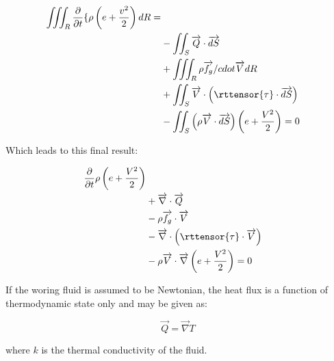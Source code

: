 \begin{equation}
  \begin{split}
  \iiint_R\frac{\partial}{\partial{t}}\{\rho\left(e + \frac{v^2}{2}\right)dR = \\
    & - \iint_S\overrightarrow{Q}\cdot\overrightarrow{dS} \\
    & + \iiint_R\rho\overrightarrow{f_g}/cdot\overrightarrow{V} dR \\ 
    & + \iint_S\overrightarrow{V}\cdot\left(\rttensor{\tau}\cdot\overrightarrow{dS}\right) \\ 
    & - \iint_S\left(\rho\overrightarrow{V} \cdot\overrightarrow{dS}\right)\left(e + \frac{V^2}{2}\right) = 0
  \end{split}
\end{equation}

Which leads to this final result:

\begin{equation}
  \begin{split}
\frac{\partial}{\partial{t}}\rho\left
(e + \frac{V^2}{2}\right) \\
    & + \overrightarrow{\nabla}\cdot\overrightarrow{Q} \\
    & -\rho\overrightarrow{f_g}\cdot\overrightarrow{V} \\
    & - \overrightarrow{\nabla}\cdot\left(\rttensor{\tau}\cdot\overrightarrow{V}\right) \\
    & - \rho\overrightarrow{V}\cdot\overrightarrow{\nabla}\left(e + \frac{V^2}{2}\right) = 0
  \end{split}
\end{equation}

If the woring fluid is assumed to be Newtonian, the heat flux is a function of thermodynamic state only and may be given as:

\begin{equation}
  \overrightarrow{Q} =  \overrightarrow{\nabla}T
\end{equation}

where $k$ is the thermal conductivity of the fluid.


